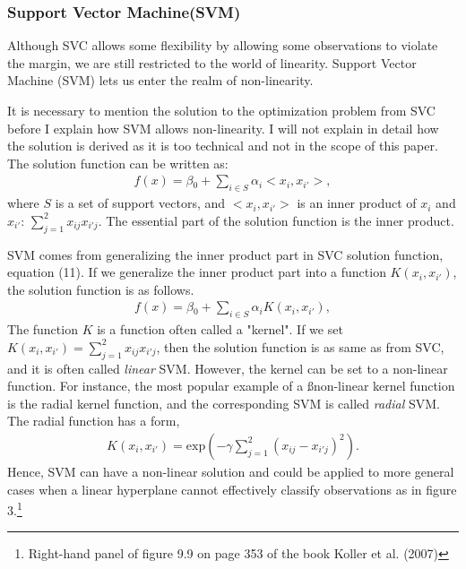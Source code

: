 \documentclass[11pt,a4paper,oneside]{article}
\begin{document}
\subsubsection{Support Vector Machine(SVM)}
Although SVC allows some flexibility by allowing some observations to violate the margin, we are still restricted to the world of linearity. Support Vector Machine (SVM) lets us enter the realm of non-linearity. 
\par
It is necessary to mention the solution to the optimization problem from SVC before I explain how SVM allows non-linearity. I will not explain in detail how the solution is derived as it is too technical and not in the scope of this paper. The solution function can be written as:
\begin{align}
    f(x) = \beta{_0} + \sum_{i\in S}\alpha_{i}<x_{i}, x_{i'}>,
\end{align}
where $S$ is a set of support vectors, and $<x_{i}, x_{i'}>$ is an inner product of $x_{i}$ and $x_{i'}$: $\sum^{2}_{j=1}x_{ij}x_{i'j}$. The essential part of the solution function is the inner product. 
\par
SVM comes from generalizing the inner product part in SVC solution function, equation (11). If we generalize the inner product part into a function $K(x_{i}, x_{i'})$, the solution function is as follows.
\begin{align}
    f(x) = \beta{_0} + \sum_{i\in S}\alpha_{i}K(x_{i}, x_{i'}),
\end{align}
The function $K$ is a function often called a "kernel". If we set $K(x_{i}, x_{i'}) = \sum^{2}_{j=1}x_{ij}x_{i'j}$, then the solution function is as same as from SVC, and it is often called \emph{linear} SVM. However, the kernel can be set to a non-linear function. For instance, the most popular example of a ßnon-linear kernel function is the radial kernel function, and the corresponding SVM is called \emph{radial} SVM. The radial function has a form,
\begin{align}
    K(x_{i}, x_{i'}) = \text{exp}(-\gamma\sum^{2}_{j=1}(x_{ij}-x_{i'j})^{2}).
\end{align}
Hence, SVM can have a non-linear solution and could be applied to more general cases when a linear hyperplane cannot effectively classify observations as in figure 3.\footnote{Right-hand panel of figure 9.9 on page 353 of the book Koller et al. (2007)\cite{koller2007introduction}}
\end{document}
